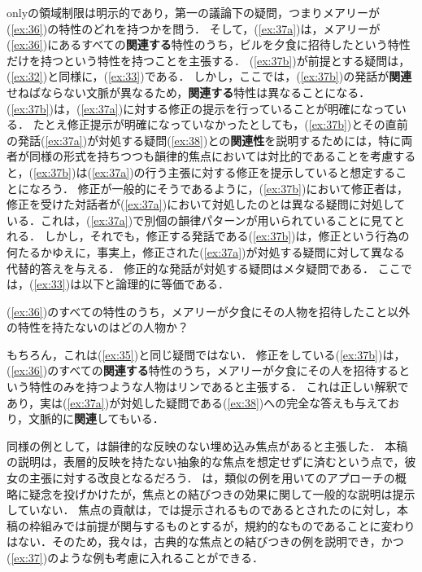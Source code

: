 \documentclass{goken}
\newcommand{\ori}[1]{\noindent\textcolor[gray]{0.7}{\fontsize{8pt}{8pt}\selectfont{\textsf{(p.~#1)}}} }
\begin{document}
\noindent
\ori{44}
onlyの領域制限は明示的であり，第一の議論下の疑問，つまりメアリーが(\ref{ex:36})の特性のどれを持つかを問う．
そして，(\ref{ex:37a})は，メアリーが(\ref{ex:36})にあるすべての\textbf{関連する}特性のうち，ビルを夕食に招待したという特性だけを持つという特性を持つことを主張する．
(\ref{ex:37b})が前提とする疑問は，(\ref{ex:32})と同様に，(\ref{ex:33})である．
しかし，ここでは，(\ref{ex:37b})の発話が\textbf{関連}せねばならない文脈が異なるため，\textbf{関連する}特性は異なることになる．
(\ref{ex:37b})は，(\ref{ex:37a})に対する修正の提示を行っていることが明確になっている．
たとえ修正提示が明確になっていなかったとしても，(\ref{ex:37b})とその直前の発話(\ref{ex:37a})が対処する疑問(\ref{ex:38})との\textbf{関連性}を説明するためには，特に両者が同様の形式を持ちつつも韻律的焦点においては対比的であることを考慮すると，(\ref{ex:37b})は(\ref{ex:37a})の行う主張に対する修正を提示していると想定することになろう．
修正が一般的にそうであるように，(\ref{ex:37b})において修正者は，修正を受けた対話者が(\ref{ex:37a})において対処したのとは異なる疑問に対処している．これは，(\ref{ex:37a})で別個の韻律パターンが用いられていることに見てとれる．
しかし，それでも，修正する発話である(\ref{ex:37b})は，修正という行為の何たるかゆえに，事実上，修正された(\ref{ex:37a})が対処する疑問に対して異なる代替的答えを与える．
修正的な発話が対処する疑問はメタ疑問である．
ここでは，(\ref{ex:33})は以下と論理的に等価である．

\begin{exe}
	\ex\label{ex:39} (\ref{ex:36})のすべての特性のうち，メアリーが夕食にその人物を招待したこと以外の特性を持たないのはどの人物か？
\end{exe}

\noindent
もちろん，これは(\ref{ex:35})と同じ疑問ではない．
修正をしている(\ref{ex:37b})は，(\ref{ex:36})のすべての\textbf{関連する}特性のうち，メアリーが夕食にその人を招待するという特性のみを持つような人物はリンであると主張する．
これは正しい解釈であり，実は(\ref{ex:37a})が対処した疑問である(\ref{ex:38})への完全な答えも与えており，文脈的に\textbf{関連}してもいる．

同様の例として，\citet{Partee1991}は韻律的な反映のない埋め込み焦点があると主張した．
本稿の説明は，表層的反映を持たない抽象的な焦点を想定せずに済むという点で，彼女の主張に対する改良となるだろう．
\citet{Vallduvi1990}は，類似の例を用いて\citeauthor{Rooth1985}のアプローチの概略に疑念を投げかけたが，焦点との結びつきの効果に関して一般的な説明は提示していない．
焦点の貢献は，\citealt{Rooth1985}では提示されるものであるとされたのに対し，本稿の枠組みでは前提が関与するものとするが，規約的なものであることに変わりはない．そのため，我々は，古典的な焦点との結びつきの例を説明でき，かつ(\ref{ex:37})のような例も考慮に入れることができる．
\end{document}
